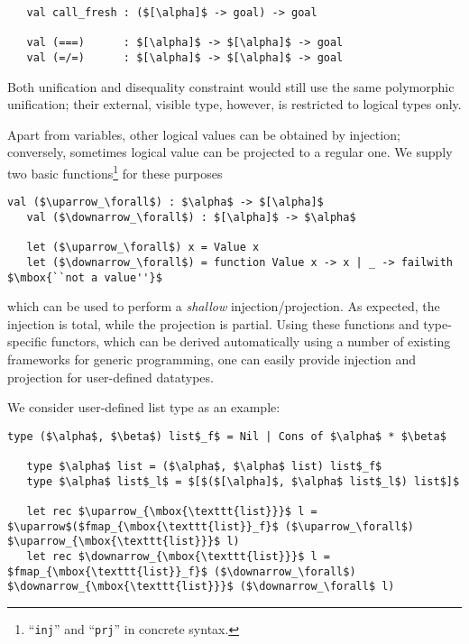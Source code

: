 \begin{lstlisting}
   val call_fresh : ($[\alpha]$ -> goal) -> goal

   val (===)      : $[\alpha]$ -> $[\alpha]$ -> goal
   val (=/=)      : $[\alpha]$ -> $[\alpha]$ -> goal
\end{lstlisting}

Both unification and disequality constraint would still use the same polymorphic unification; their external, visible type,
however, is restricted to logical types only.

Apart from variables, other logical values can be obtained by injection; conversely, sometimes logical value can be projected to 
a regular one. We supply two basic functions\footnote{``\lstinline{inj}'' and ``\lstinline{prj}'' in concrete syntax.}
for these purposes

\begin{lstlisting}[mathescape=true]
   val ($\uparrow_\forall$) : $\alpha$ -> $[\alpha]$ 
   val ($\downarrow_\forall$) : $[\alpha]$ -> $\alpha$

   let ($\uparrow_\forall$) x = Value x
   let ($\downarrow_\forall$) = function Value x -> x | _ -> failwith $\mbox{``not a value''}$
\end{lstlisting}

which can be used to perform a \emph{shallow} injection/projection. As expected, the injection is total, while the projection is partial. 
Using these functions and type-specific functors, which can be derived automatically using a number of existing frameworks for 
generic programming, one can easily provide injection and projection for user-defined datatypes.

We consider user-defined list type as an example:

\begin{lstlisting}[mathescape=true]
   type ($\alpha$, $\beta$) list$_f$ = Nil | Cons of $\alpha$ * $\beta$
   
   type $\alpha$ list = ($\alpha$, $\alpha$ list) list$_f$
   type $\alpha$ list$_l$ = $[$($[\alpha]$, $\alpha$ list$_l$) list$]$

   let rec $\uparrow_{\mbox{\texttt{list}}}$ l = $\uparrow$($fmap_{\mbox{\texttt{list}}_f}$ ($\uparrow_\forall$) $\uparrow_{\mbox{\texttt{list}}}$ l) 
   let rec $\downarrow_{\mbox{\texttt{list}}}$ l = $fmap_{\mbox{\texttt{list}}_f}$ ($\downarrow_\forall$) $\downarrow_{\mbox{\texttt{list}}}$ ($\downarrow_\forall$ l)
\end{lstlisting}

